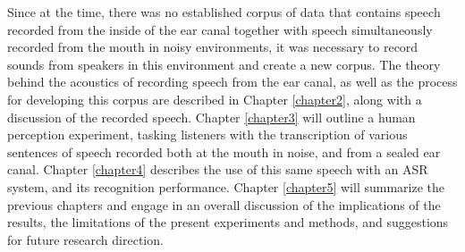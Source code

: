 Since at the time, there was no established corpus of data that contains speech recorded from the inside of the ear canal together with speech simultaneously recorded from the mouth in noisy environments, it was necessary to record sounds from speakers in this environment and create a new corpus.  The theory behind the acoustics of recording speech from the ear canal, as well as the process for developing this corpus are described in Chapter \ref{chapter2}, along with a discussion of the recorded speech.  Chapter \ref{chapter3} will outline a human perception experiment, tasking listeners with the transcription of various sentences of speech recorded both at the mouth in noise, and from a sealed ear canal.  Chapter \ref{chapter4} describes the use of this same speech with an ASR system, and its recognition performance.  Chapter \ref{chapter5} will summarize the previous chapters and engage in an overall discussion of the implications of the results, the limitations of the present experiments and methods, and suggestions for future research direction.


